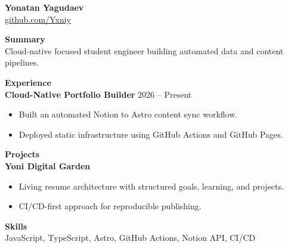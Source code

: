 \documentclass[11pt]{article}
\begin{document}
{\LARGE \textbf{Yonatan Yagudaev}}\\
\href{https://github.com/Yxniy}{github.com/Yxniy}

\vspace{0.5em}
\textbf{Summary}\\
Cloud-native focused student engineer building automated data and content pipelines.

\vspace{0.6em}
\textbf{Experience}\\
\textbf{Cloud-Native Portfolio Builder} \hfill 2026 -- Present\\
\begin{itemize}[leftmargin=*]
  \item Built an automated Notion to Astro content sync workflow.
  \item Deployed static infrastructure using GitHub Actions and GitHub Pages.
\end{itemize}

\vspace{0.6em}
\textbf{Projects}\\
\textbf{Yoni Digital Garden}\\
\begin{itemize}[leftmargin=*]
  \item Living resume architecture with structured goals, learning, and projects.
  \item CI/CD-first approach for reproducible publishing.
\end{itemize}

\vspace{0.6em}
\textbf{Skills}\\
JavaScript, TypeScript, Astro, GitHub Actions, Notion API, CI/CD
\end{document}
